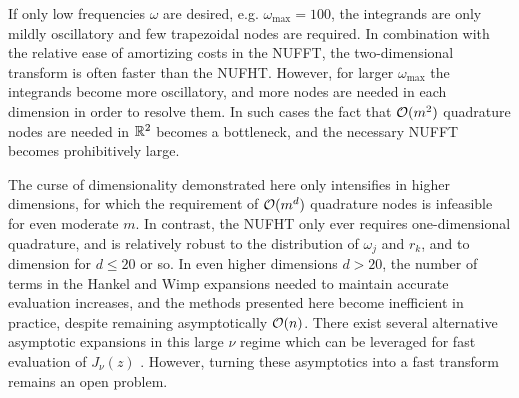 If only low frequencies $\omega$ are desired, e.g. $\omega_{\text{max}} = 100$,
the integrands are only mildly oscillatory and few trapezoidal nodes are
required. In combination with the relative ease of amortizing costs in the
NUFFT, the two-dimensional transform is often faster than the NUFHT. However,
for larger $\omega_{\text{max}}$ the integrands become more oscillatory, and
more nodes are needed in each dimension in order to resolve them. In such cases
the fact that $\mathcal{O}(m^2)$ quadrature nodes are needed in $\mathbb{R}^2$ becomes a
bottleneck, and the necessary NUFFT becomes prohibitively large. 


The curse of dimensionality demonstrated here only intensifies in higher
dimensions, for which the requirement of $\mathcal{O}(m^d)$ quadrature nodes is
infeasible for even moderate $m$. In contrast, the NUFHT only ever requires
one-dimensional quadrature, and is relatively robust to the distribution of
$\omega_j$ and $r_k$, and to dimension for $d \leq 20$ or so. In even higher
dimensions $d > 20$, the number of terms in the Hankel and Wimp expansions
needed to maintain accurate evaluation increases, and the methods presented here
become inefficient in practice, despite remaining asymptotically $\mathcal{O}(n)$. There
exist several alternative asymptotic expansions in this large $\nu$ regime which
can be leveraged for fast evaluation of $J_\nu(z)$
\citep[10.19]{heitman2015asymptotics, olver2010nist}. However, turning these
asymptotics into a fast transform remains an open problem.
